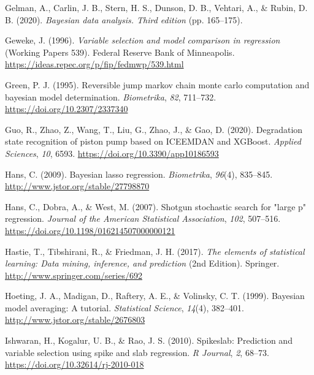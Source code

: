 \documentclass[
  11pt,
]{article}
\newlength{\cslhangindent}
\newlength{\cslentryspacingunit} %
\newenvironment{CSLReferences}[2] %
 {%
  \setlength{\parindent}{0pt}
  \ifodd #1
  \let\oldpar\par
  \def\par{\hangindent=\cslhangindent\oldpar}
  \fi
  \setlength{\parskip}{#2\cslentryspacingunit}
 }%
 {}
\begin{document}
\begin{CSLReferences}{1}{0}
\leavevmode{}%
Gelman, A., Carlin, J. B., Stern, H. S., Dunson, D. B., Vehtari, A., \&
Rubin, D. B. (2020). \emph{Bayesian data analysis. Third edition} (pp.
165--175).

\leavevmode{}%
Geweke, J. (1996). \emph{Variable selection and model comparison in
regression} (Working Papers 539). Federal Reserve Bank of Minneapolis.
\url{https://ideas.repec.org/p/fip/fedmwp/539.html}

\leavevmode{}%
Green, P. J. (1995). Reversible jump markov chain monte carlo
computation and bayesian model determination. \emph{Biometrika},
\emph{82}, 711--732. \url{https://doi.org/10.2307/2337340}

\leavevmode{}%
Guo, R., Zhao, Z., Wang, T., Liu, G., Zhao, J., \& Gao, D. (2020).
Degradation state recognition of piston pump based on ICEEMDAN and
XGBoost. \emph{Applied Sciences}, \emph{10}, 6593.
\url{https://doi.org/10.3390/app10186593}

\leavevmode{}%
Hans, C. (2009). Bayesian lasso regression. \emph{Biometrika},
\emph{96}(4), 835--845. \url{http://www.jstor.org/stable/27798870}

\leavevmode{}%
Hans, C., Dobra, A., \& West, M. (2007). Shotgun stochastic search for
"large p" regression. \emph{Journal of the American Statistical
Association}, \emph{102}, 507--516.
\url{https://doi.org/10.1198/016214507000000121}

\leavevmode{}%
Hastie, T., Tibshirani, R., \& Friedman, J. H. (2017). \emph{The
elements of statistical learning: Data mining, inference, and
prediction} (2nd Edition). Springer.
\url{http://www.springer.com/series/692}

\leavevmode{}%
Hoeting, J. A., Madigan, D., Raftery, A. E., \& Volinsky, C. T. (1999).
Bayesian model averaging: A tutorial. \emph{Statistical Science},
\emph{14}(4), 382--401. \url{http://www.jstor.org/stable/2676803}

\leavevmode{}%
Ishwaran, H., Kogalur, U. B., \& Rao, J. S. (2010). Spikeslab:
Prediction and variable selection using spike and slab regression.
\emph{R Journal}, \emph{2}, 68--73.
\url{https://doi.org/10.32614/rj-2010-018}


\end{CSLReferences}
\end{document}
